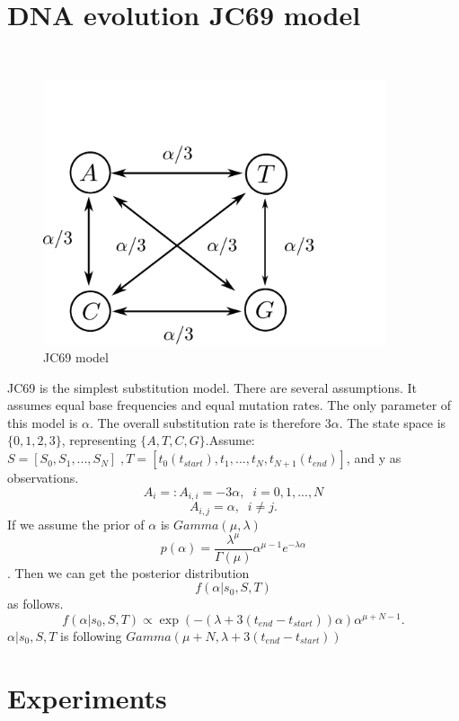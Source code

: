 \section{DNA evolution JC69 model }~
  \begin{figure}%
  \centering
  \begin{minipage}[!hp]{0.45\linewidth}
  \centering
    \includegraphics [width=0.90\textwidth, angle=0]{figs/jc_model.pdf}
    \caption{JC69 model}
      \end{minipage}
	\label{jc_model}
  \end{figure}

JC69 is the simplest substitution model. There are several assumptions. It assumes equal base frequencies and equal mutation rates. The only parameter of this model is $\alpha$. The overall substitution rate is therefore $3\alpha$. The state space is $\{0, 1, 2, 3\}$, representing $\{A, T, C, G\}$.\noindent Assume: $S = [S_0,S_1, ...,S_N] \;, T = [t_0(t_{start}), t_1,...,t_N, t_{N+1}(t_{end})]$, and y as observations.\\
$$A_i =: A_{i,i} = -3\alpha, \; \; i =0,1,...,N$$ $$A_{i, j} = \alpha, \; \; i \neq j.$$
If we assume the prior of $\alpha$ is $Gamma(\mu,\lambda)$\\
$$p(\alpha) = \frac{\lambda^\mu}{\Gamma(\mu)}\alpha^{\mu -1}e^{-\lambda \alpha} $$.
Then we can get the posterior distribution $$f(\alpha | s_0,S,T)$$ as follows.
$$ f(\alpha| s_0,S,T) \propto \exp(-(\lambda + 3(t_{end} - t_{start}))\alpha) \alpha^{\mu + N -1} .$$
$\alpha | s_0,S,T$ is following $Gamma(\mu+ N,\lambda + 3(t_{end} - t_{start}))$\\
\section{Experiments}

